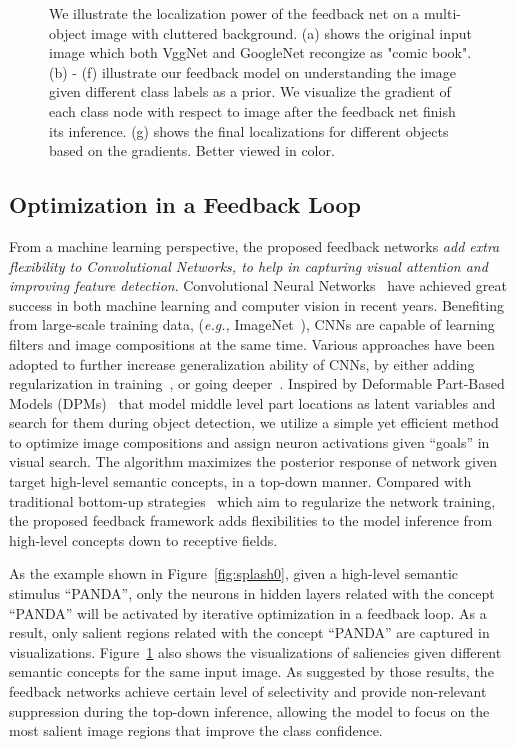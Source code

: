 \begin{figure}[htb]
\begin{center}
\caption{We illustrate the localization power of the feedback net on a multi-object image with cluttered background. (a) shows the original input image which both VggNet and GoogleNet recongize as "comic book". (b) - (f) illustrate our feedback model on understanding the image given different class labels as a prior. We visualize the gradient of each class node with respect to image after the feedback net finish its inference. (g) shows the final localizations for different objects based on the gradients. Better viewed in color.}
\label{fig:splah}
\end{center}
\end{figure}

\subsection{Optimization in a Feedback Loop}
From a machine learning perspective, the proposed feedback networks \emph{add extra flexibility to Convolutional Networks, to help in capturing visual attention and improving feature detection}. Convolutional Neural Networks~\cite{lecun1998gradient, Krizhevsky2012ImageNet, Simonyan2014Very} have achieved great success in both machine learning and computer vision in recent years. Benefiting from large-scale training data, (\emph{e.g.,} ImageNet~\cite{deng2009imagenet}), CNNs are capable of learning filters and image compositions at the same time. Various approaches have been adopted to further increase generalization ability of CNNs, by either adding regularization in training~\cite{he2015delving,ioffe2015batch}, or going deeper~\cite{Simonyan2014Very, Szegedy2014Going}. Inspired by Deformable Part-Based Models (DPMs)~\cite{Felzenszwalb2010Object} that model middle level part locations as latent variables and search for them during object detection, we utilize a simple yet efficient method to optimize image compositions and assign neuron activations given ``goals'' in visual search. The algorithm maximizes the posterior response of network given target high-level semantic concepts, in a top-down manner. Compared with traditional bottom-up strategies~\cite{he2015delving, ioffe2015batch} which aim to regularize the network training, the proposed feedback framework adds flexibilities to the model inference from high-level concepts down to receptive fields.

As the example shown in Figure~\ref{fig:splash0}, given a high-level semantic stimulus ``PANDA'', only the neurons in hidden layers related with the concept ``PANDA'' will be activated by iterative optimization in a feedback loop. As a result, only salient regions related with the concept ``PANDA'' are captured in visualizations. Figure~\ref{fig:splah} also shows the visualizations of saliencies given different semantic concepts for the same input image. As suggested by those results, the feedback networks achieve certain level of selectivity and provide non-relevant suppression during the top-down inference, allowing the model to focus on the most salient image regions that improve the class confidence.

